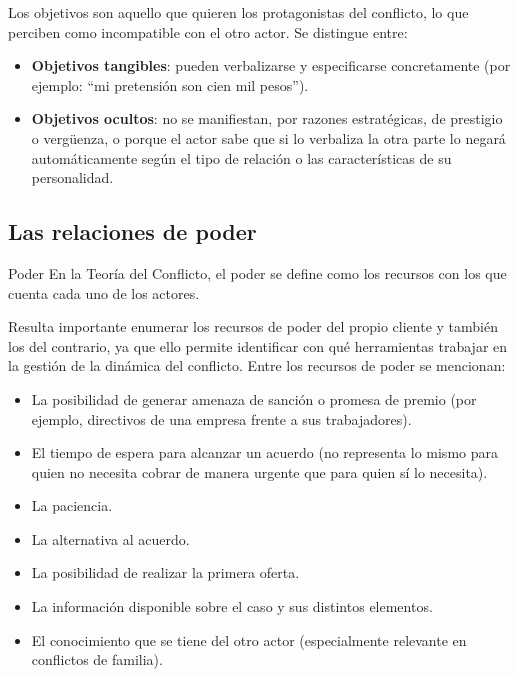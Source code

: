 \documentclass[12pt,oneside]{book}
\begin{document}
Los objetivos son aquello que quieren los protagonistas del conflicto, lo que perciben como incompatible con el otro actor. Se distingue entre:

\begin{itemize}
    \item \textbf{Objetivos tangibles}: pueden verbalizarse y especificarse concretamente (por ejemplo: ``mi pretensión son cien mil pesos'').
    \item \textbf{Objetivos ocultos}: no se manifiestan, por razones estratégicas, de prestigio o vergüenza, o porque el actor sabe que si lo verbaliza la otra parte lo negará automáticamente según el tipo de relación o las características de su personalidad.
\end{itemize}

\subsection{Las relaciones de poder}

\begin{definition}{Poder}
En la Teoría del Conflicto, el poder se define como los recursos con los que cuenta cada uno de los actores.
\end{definition}

Resulta importante enumerar los recursos de poder del propio cliente y también los del contrario, ya que ello permite identificar con qué herramientas trabajar en la gestión de la dinámica del conflicto. Entre los recursos de poder se mencionan:

\begin{itemize}
    \item La posibilidad de generar amenaza de sanción o promesa de premio (por ejemplo, directivos de una empresa frente a sus trabajadores).
    \item El tiempo de espera para alcanzar un acuerdo (no representa lo mismo para quien no necesita cobrar de manera urgente que para quien sí lo necesita).
    \item La paciencia.
    \item La alternativa al acuerdo.
    \item La posibilidad de realizar la primera oferta.
    \item La información disponible sobre el caso y sus distintos elementos.
    \item El conocimiento que se tiene del otro actor (especialmente relevante en conflictos de familia).
\end{itemize}
\end{document}
